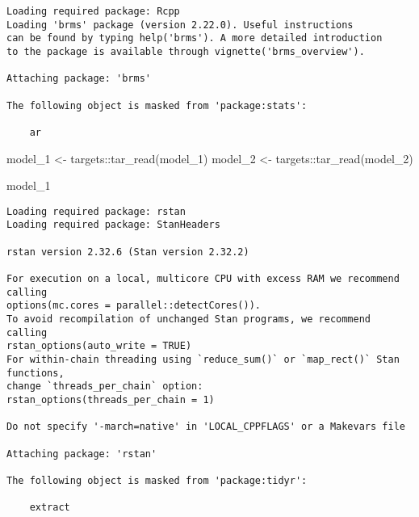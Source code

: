 \documentclass[
  letterpaper,
  DIV=11,
  numbers=noendperiod]{scrreprt}
\newenvironment{Shaded}{\begin{snugshade}}{\end{snugshade}}
\newcommand{\FunctionTok}[1]{\textcolor[rgb]{0.28,0.35,0.67}{#1}}
\newcommand{\NormalTok}[1]{\textcolor[rgb]{0.00,0.23,0.31}{#1}}
\newcommand{\OtherTok}[1]{\textcolor[rgb]{0.00,0.23,0.31}{#1}}
\newcommand{\SpecialCharTok}[1]{\textcolor[rgb]{0.37,0.37,0.37}{#1}}
\begin{document}
\begin{verbatim}
Loading required package: Rcpp
Loading 'brms' package (version 2.22.0). Useful instructions
can be found by typing help('brms'). A more detailed introduction
to the package is available through vignette('brms_overview').

Attaching package: 'brms'

The following object is masked from 'package:stats':

    ar
\end{verbatim}

\begin{Shaded}
\begin{Highlighting}[]
\NormalTok{model\_1 }\OtherTok{\textless{}{-}}\NormalTok{ targets}\SpecialCharTok{::}\FunctionTok{tar\_read}\NormalTok{(model\_1)}
\NormalTok{model\_2 }\OtherTok{\textless{}{-}}\NormalTok{ targets}\SpecialCharTok{::}\FunctionTok{tar\_read}\NormalTok{(model\_2)}

\NormalTok{model\_1}
\end{Highlighting}
\end{Shaded}

\begin{verbatim}
Loading required package: rstan
Loading required package: StanHeaders

rstan version 2.32.6 (Stan version 2.32.2)

For execution on a local, multicore CPU with excess RAM we recommend calling
options(mc.cores = parallel::detectCores()).
To avoid recompilation of unchanged Stan programs, we recommend calling
rstan_options(auto_write = TRUE)
For within-chain threading using `reduce_sum()` or `map_rect()` Stan functions,
change `threads_per_chain` option:
rstan_options(threads_per_chain = 1)

Do not specify '-march=native' in 'LOCAL_CPPFLAGS' or a Makevars file

Attaching package: 'rstan'

The following object is masked from 'package:tidyr':

    extract
\end{verbatim}
\end{document}
